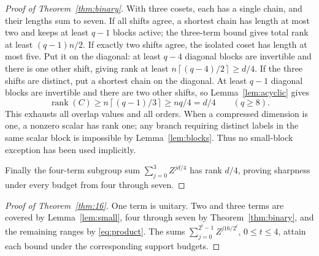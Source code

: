 \documentclass[11pt,a4paper]{article}
\theoremstyle{remark}\newtheorem{remark}[theorem]{Remark}
\DeclareMathOperator{\rank}{rank}
\newcommand{\ceil}[1]{\left\lceil #1\right\rceil}
\begin{document}
\begin{proof}[Proof of Theorem~\ref{thm:binary}]
With three cosets, each has a single chain, and their lengths sum to seven. If all shifts agree, a shortest chain has length at most two and keeps at least $q-1$ blocks active; the three-term bound gives total rank at least $(q-1)n/2$. If exactly two shifts agree, the isolated coset has length at most five. Put it on the diagonal: at least $q-4$ diagonal blocks are invertible and there is one other shift, giving rank at least $n\ceil{(q-4)/2}\ge d/4$. If the three shifts are distinct, put a shortest chain on the diagonal. At least $q-1$ diagonal blocks are invertible and there are two other shifts, so Lemma~\ref{lem:acyclic} gives
\[
 \rank(C)\ge n\ceil{(q-1)/3}\ge nq/4=d/4 \qquad(q\ge8).
\]
This exhausts all overlap values and all orders. When a compressed dimension is one, a nonzero scalar has rank one; any branch requiring distinct labels in the same scalar block is impossible by Lemma~\ref{lem:blocks}. Thus no small-block exception has been used implicitly.

Finally the four-term subgroup sum $\sum_{j=0}^3Z^{jd/4}$ has rank $d/4$, proving sharpness under every budget from four through seven.
\end{proof}

\begin{proof}[Proof of Theorem~\ref{thm:16}]
One term is unitary. Two and three terms are covered by Lemma~\ref{lem:small}, four through seven by Theorem~\ref{thm:binary}, and the remaining ranges by \eqref{eq:product}. The sums $\sum_{j=0}^{2^t-1}Z^{j16/2^t}$, $0\le t\le4$, attain each bound under the corresponding support budgets.
\end{proof}
\end{document}
